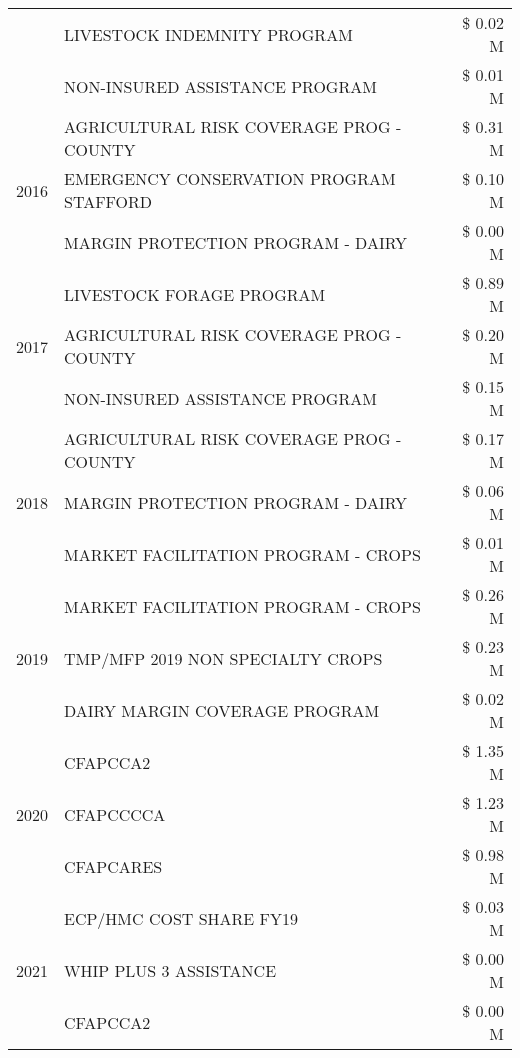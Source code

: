 \begin{tabular}{llr}
 & LIVESTOCK INDEMNITY PROGRAM & \$ 0.02 M \\
 & NON-INSURED ASSISTANCE PROGRAM & \$ 0.01 M \\
\cline{1-3}
\multirow[t]{3}{*}{2016} & AGRICULTURAL RISK COVERAGE PROG - COUNTY & \$ 0.31 M \\
 & EMERGENCY CONSERVATION PROGRAM STAFFORD & \$ 0.10 M \\
 & MARGIN PROTECTION PROGRAM - DAIRY & \$ 0.00 M \\
\cline{1-3}
\multirow[t]{3}{*}{2017} & LIVESTOCK FORAGE PROGRAM & \$ 0.89 M \\
 & AGRICULTURAL RISK COVERAGE PROG - COUNTY & \$ 0.20 M \\
 & NON-INSURED ASSISTANCE PROGRAM & \$ 0.15 M \\
\cline{1-3}
\multirow[t]{3}{*}{2018} & AGRICULTURAL RISK COVERAGE PROG - COUNTY & \$ 0.17 M \\
 & MARGIN PROTECTION PROGRAM - DAIRY & \$ 0.06 M \\
 & MARKET FACILITATION PROGRAM - CROPS & \$ 0.01 M \\
\cline{1-3}
\multirow[t]{3}{*}{2019} & MARKET FACILITATION PROGRAM - CROPS & \$ 0.26 M \\
 & TMP/MFP 2019 NON SPECIALTY CROPS & \$ 0.23 M \\
 & DAIRY MARGIN COVERAGE PROGRAM & \$ 0.02 M \\
\cline{1-3}
\multirow[t]{3}{*}{2020} & CFAPCCA2 & \$ 1.35 M \\
 & CFAPCCCCA & \$ 1.23 M \\
 & CFAPCARES & \$ 0.98 M \\
\cline{1-3}
\multirow[t]{3}{*}{2021} & ECP/HMC COST SHARE FY19 & \$ 0.03 M \\
 & WHIP PLUS 3 ASSISTANCE & \$ 0.00 M \\
 & CFAPCCA2 & \$ 0.00 M \\
\cline{1-3}
\bottomrule
\end{tabular}
